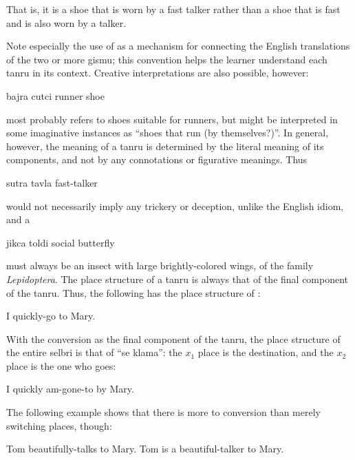 That is, it is a shoe that is worn by a fast talker rather than a shoe that is fast and is also worn by a talker.

Note especially the use of  as a mechanism for connecting the English translations of the two or more gismu; this convention helps the learner understand each tanru in its context. Creative interpretations are also possible, however:
\begin{example}
bajra cutci\n
runner shoe
\end{example}

{\noindent}most probably refers to shoes suitable for runners, but might be interpreted in some imaginative instances as ``shoes that run (by themselves?)''. In general, however, the meaning of a tanru is determined by the literal meaning of its components, and not by any connotations or figurative meanings. Thus
\begin{example}
sutra tavla\n
fast-talker
\end{example}

{\noindent}would not necessarily imply any trickery or deception, unlike the English idiom, and a
\begin{example}
jikca toldi\n
social butterfly
\end{example}

{\noindent}must always be an insect with large brightly-colored wings, of the family \textit{Lepidoptera}. The place structure of a tanru is always that of the final component of the tanru. Thus, the following has the place structure of :
\begin{example}
   \n
I quickly-go to Mary.
\end{example}

With the conversion  as the final component of the tanru, the place structure of the entire selbri is that of ``se klama'': the $x_1$ place is the destination, and the $x_2$ place is the one who goes:
\begin{example}
   \n
I quickly am-gone-to by Mary.
\end{example}

The following example shows that there is more to conversion than merely switching places, though:
\begin{example}
   \n
Tom beautifully-talks to Mary.\n
Tom is a beautiful-talker to Mary.
\end{example}

